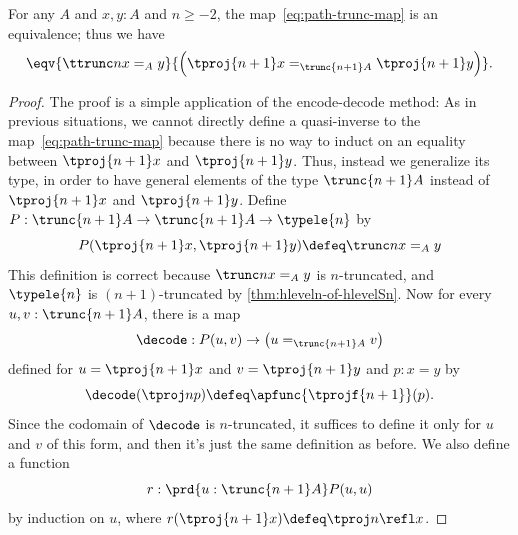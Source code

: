 %
\begin{thm} \label{thm:path-truncation}
  For any $A$ and $x,y:A$ and $n\ge -2$, the map~\eqref{eq:path-trunc-map} is an equivalence; thus we have
  \[ \eqv{\ttrunc n{x=_Ay}}{\Big(\tproj {n+1}x=_{\trunc{n+1}A}\tproj {n+1}y\Big)}. \]
\end{thm}

\begin{proof}
  The proof is a simple application of the encode-decode method:
  As in previous situations, we cannot directly define a quasi-inverse to the map~\eqref{eq:path-trunc-map} because there is no way to induct on an
equality between $\tproj {n+1}x$ and $\tproj {n+1}y$.
  Thus, instead we generalize its type, in order to have general elements of the type $\trunc{n+1}A$ instead of $\tproj {n+1}x$ and $\tproj
{n+1}y$.
  Define $P:\trunc {n+1}A\to\trunc {n+1}A\to\typele{n}$ by
  \[P(\tproj {n+1}x,\tproj {n+1}y)\defeq \trunc n{x=_Ay}\]
  This definition is correct because $\trunc n{x=_Ay}$ is $n$-truncated, and $\typele{n}$ is $(n+1)$-truncated by
\cref{thm:hleveln-of-hlevelSn}.
  Now for every $u,v:\trunc{n+1}A$, there is a map
  \[\decode:P(u,v) \to \big(u=_{\trunc{n+1}A}v\big)\]
  defined for $u=\tproj {n+1}x$ and $v=\tproj {n+1}y$ and $p:x=y$ by
  \[\decode(\tproj n{p})\defeq \apfunc{\tprojf{n+1}} (p).\]
  Since the codomain of $\decode$ is $n$-truncated, it suffices to define it only for $u$ and $v$ of this form, and then it's just the same
definition as before.
  We also define a function
  \[ r : \prd{u:\trunc{n+1} A} P(u,u) \]
  by induction on $u$, where $r(\tproj{n+1} x) \defeq \tproj n {\refl x}$.


\end{proof}
